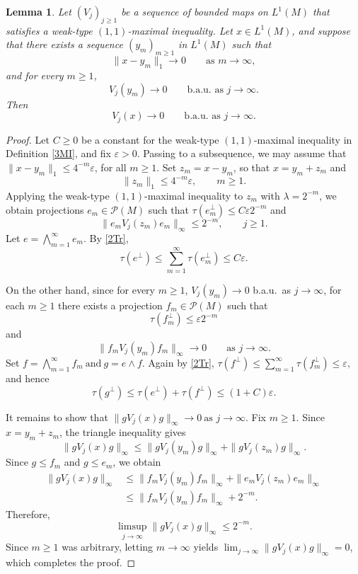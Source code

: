 \documentclass[10pt,a4paper]{amsart}
\newtheorem{lemma}{Lemma}
\renewcommand{\P}{\mbox{${\mathcal P}$}}
\begin{document}
\begin{lemma}\label{3Y1}
Let $(V_j)_{j\geq1}$ be a sequence of bounded maps on $L^1(M)$ that
satisfies a weak-type $(1,1)$-maximal inequality. Let $x\in L^1(M)$,
and suppose that there exists a sequence $(y_m)_{m\geq1}$ in $L^1(M)$
such that
\[
\|x-y_m\|_1\longrightarrow0
\qquad\text{as }m\to\infty,
\]
and for every $m\geq1$,
\[
V_j(y_m)\longrightarrow0
\qquad\text{b.a.u.\ as }j\to\infty.
\]
Then
\[
V_j(x)\longrightarrow0
\qquad\text{b.a.u.\ as }j\to\infty.
\]
\end{lemma}

\begin{proof}
Let $C\geq0$ be a constant for the weak-type $(1,1)$-maximal inequality in Definition \ref{3MI}, and fix $\varepsilon>0$. Passing to a subsequence, 
we may assume that
$\|x-y_m\|_1\leq4^{-m}\varepsilon$,
for all $m\geq1$.
Set $z_m=x-y_m$, so that $x=y_m+z_m$ and
\[
\|z_m\|_1\leq4^{-m}\varepsilon,
\qquad m\geq1.
\]
Applying the weak-type $(1,1)$-maximal inequality to $z_m$ with $\lambda=2^{-m}$, we obtain projections $e_m\in\P(M)$ such that
\(\tau(e_m^\perp)\leq C\varepsilon 2^{-m}\)
and
\[
\|e_mV_j(z_m)e_m\|_\infty\leq2^{-m},
\qquad j\geq1.
\]
Let
\(e=\bigwedge_{m=1}^\infty e_m.
\)
By \eqref{2Tr},
\[
\tau(e^\perp)
\leq\sum_{m=1}^\infty\tau(e_m^\perp)
\leq C\varepsilon.
\]

On the other hand, since for every $m\geq1$, $V_j(y_m)\to0$ b.a.u.\ as $j\to\infty$, for each $m\geq1$ there exists a projection $f_m\in\P(M)$ such that
\[
\tau(f_m^\perp)\leq\varepsilon2^{-m}
\]
and
\[
\|f_mV_j(y_m)f_m\|_\infty\longrightarrow0
\qquad\text{as }j\to\infty.
\]
Set
\(f=\bigwedge_{m=1}^\infty f_m
\ \text{and}\
g=e\wedge f.\)
Again by \eqref{2Tr},
\(\tau(f^\perp)
\leq\sum_{m=1}^\infty\tau(f_m^\perp)
\leq\varepsilon, \)
and hence
\[
\tau(g^\perp)
\leq\tau(e^\perp)+\tau(f^\perp)
\leq(1+C)\varepsilon.
\]

It remains to show that
\(\|gV_j(x)g\|_\infty\longrightarrow0
\ \text{as }j\to\infty.\)
Fix $m\geq1$. Since $x=y_m+z_m$, the triangle inequality gives
\[
\|gV_j(x)g\|_\infty
\leq
\|gV_j(y_m)g\|_\infty
+
\|gV_j(z_m)g\|_\infty.
\]
Since $g\leq f_m$ and $g\leq e_m$, we obtain
\[
\begin{aligned}
\|gV_j(x)g\|_\infty
&\leq
\|f_mV_j(y_m)f_m\|_\infty
+
\|e_mV_j(z_m)e_m\|_\infty\\
&\leq
\|f_mV_j(y_m)f_m\|_\infty+2^{-m}.
\end{aligned}
\]
Therefore,
\[
\limsup_{j\to\infty}\|gV_j(x)g\|_\infty
\leq2^{-m}.
\]
Since $m\geq1$ was arbitrary, letting $m\to\infty$ yields \(\lim_{j\to\infty}\|gV_j(x)g\|_\infty = 0\), which completes the proof.
\end{proof}
\end{document}
